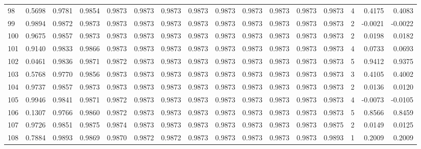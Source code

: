 \begin{tabular}{lrrrrrrrrrrrrrrr}
98  &      0.5698 &  0.9781 &  0.9854 &  0.9873 &  0.9873 &  0.9873 &  0.9873 &  0.9873 &  0.9873 &  0.9873 &   0.9873 &     0.9873 &      4 &                    0.4175 &                     0.4083 \\
99  &      0.9894 &  0.9872 &  0.9873 &  0.9873 &  0.9873 &  0.9873 &  0.9873 &  0.9873 &  0.9873 &  0.9873 &   0.9873 &     0.9873 &      2 &                   -0.0021 &                    -0.0022 \\
100 &      0.9675 &  0.9857 &  0.9873 &  0.9873 &  0.9873 &  0.9873 &  0.9873 &  0.9873 &  0.9873 &  0.9873 &   0.9873 &     0.9873 &      2 &                    0.0198 &                     0.0182 \\
101 &      0.9140 &  0.9833 &  0.9866 &  0.9873 &  0.9873 &  0.9873 &  0.9873 &  0.9873 &  0.9873 &  0.9873 &   0.9873 &     0.9873 &      4 &                    0.0733 &                     0.0693 \\
102 &      0.0461 &  0.9836 &  0.9871 &  0.9872 &  0.9873 &  0.9873 &  0.9873 &  0.9873 &  0.9873 &  0.9873 &   0.9873 &     0.9873 &      5 &                    0.9412 &                     0.9375 \\
103 &      0.5768 &  0.9770 &  0.9856 &  0.9873 &  0.9873 &  0.9873 &  0.9873 &  0.9873 &  0.9873 &  0.9873 &   0.9873 &     0.9873 &      3 &                    0.4105 &                     0.4002 \\
104 &      0.9737 &  0.9857 &  0.9873 &  0.9873 &  0.9873 &  0.9873 &  0.9873 &  0.9873 &  0.9873 &  0.9873 &   0.9873 &     0.9873 &      2 &                    0.0136 &                     0.0120 \\
105 &      0.9946 &  0.9841 &  0.9871 &  0.9872 &  0.9873 &  0.9873 &  0.9873 &  0.9873 &  0.9873 &  0.9873 &   0.9873 &     0.9873 &      4 &                   -0.0073 &                    -0.0105 \\
106 &      0.1307 &  0.9766 &  0.9860 &  0.9872 &  0.9873 &  0.9873 &  0.9873 &  0.9873 &  0.9873 &  0.9873 &   0.9873 &     0.9873 &      5 &                    0.8566 &                     0.8459 \\
107 &      0.9726 &  0.9851 &  0.9875 &  0.9874 &  0.9873 &  0.9873 &  0.9873 &  0.9873 &  0.9873 &  0.9873 &   0.9873 &     0.9875 &      2 &                    0.0149 &                     0.0125 \\
108 &      0.7884 &  0.9893 &  0.9869 &  0.9870 &  0.9872 &  0.9872 &  0.9873 &  0.9873 &  0.9873 &  0.9873 &   0.9873 &     0.9893 &      1 &                    0.2009 &                     0.2009 \\

\end{tabular}
